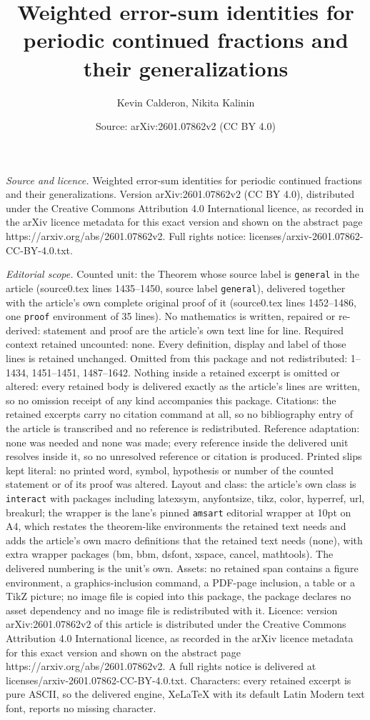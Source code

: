 \documentclass[10pt,a4paper]{amsart}
\title[Weighted error-sum identities for periodic continued fractio]{Weighted error-sum identities for periodic continued fractions and their generalizations}
\author{Kevin Calderon, Nikita Kalinin}
\date{Source: arXiv:2601.07862v2 (CC BY 4.0)}
\begin{document}
\maketitle

\noindent\emph{Source and licence.} Weighted error-sum identities for periodic continued fractions and their generalizations. Version arXiv:2601.07862v2 (CC BY 4.0), distributed under the Creative Commons Attribution 4.0 International licence, as recorded in the arXiv licence metadata for this exact version and shown on the abstract page https://arxiv.org/abs/2601.07862v2. Full rights notice: licenses/arxiv-2601.07862-CC-BY-4.0.txt.\par\smallskip

\noindent\textit{Editorial scope.} Counted unit: the Theorem whose source label is \texttt{general} in the article (source0.tex lines 1435--1450, source label \texttt{general}), delivered together with the article's own complete original proof of it (source0.tex lines 1452--1486, one \texttt{proof} environment of 35 lines). No mathematics is written, repaired or re-derived: statement and proof are the article's own text line for line. Required context retained uncounted: none. Every definition, display and label of those lines is retained unchanged. Omitted from this package and not redistributed: 1--1434, 1451--1451, 1487--1642. Nothing inside a retained excerpt is omitted or altered: every retained body is delivered exactly as the article's lines are written, so no omission receipt of any kind accompanies this package. Citations: the retained excerpts carry no citation command at all, so no bibliography entry of the article is transcribed and no reference is redistributed. Reference adaptation: none was needed and none was made; every reference inside the delivered unit resolves inside it, so no unresolved reference or citation is produced. Printed slips kept literal: no printed word, symbol, hypothesis or number of the counted statement or of its proof was altered. Layout and class: the article's own class is \texttt{interact} with packages including latexsym, anyfontsize, tikz, color, hyperref, url, breakurl; the wrapper is the lane's pinned \texttt{amsart} editorial wrapper at 10pt on A4, which restates the theorem-like environments the retained text needs and adds the article's own macro definitions that the retained text needs (none), with extra wrapper packages (bm, bbm, dsfont, xspace, cancel, mathtools). The delivered numbering is the unit's own. Assets: no retained span contains a figure environment, a graphics-inclusion command, a PDF-page inclusion, a table or a TikZ picture; no image file is copied into this package, the package declares no asset dependency and no image file is redistributed with it. Licence: version arXiv:2601.07862v2 of this article is distributed under the Creative Commons Attribution 4.0 International licence, as recorded in the arXiv licence metadata for this exact version and shown on the abstract page https://arxiv.org/abs/2601.07862v2. A full rights notice is delivered at licenses/arxiv-2601.07862-CC-BY-4.0.txt. Characters: every retained excerpt is pure ASCII, so the delivered engine, XeLaTeX with its default Latin Modern text font, reports no missing character.
\end{document}
